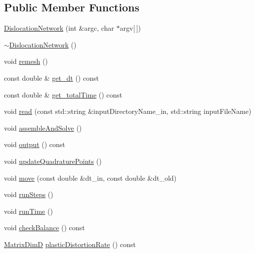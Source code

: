 \subsection*{Public Member Functions}
\begin{DoxyCompactItemize}
\item 
\hyperlink{classmodel_1_1_dislocation_network_a2fb437bf9aa809f61872b6de67f3f427}{Dislocation\+Network} (int \&argc, char $\ast$argv\mbox{[}$\,$\mbox{]})
\item 
\hyperlink{classmodel_1_1_dislocation_network_ae0f3114527433e67c6172b290516092c}{$\sim$\+Dislocation\+Network} ()
\item 
void \hyperlink{classmodel_1_1_dislocation_network_a997aa526174dcf7107679491327b0f5a}{remesh} ()
\item 
const double \& \hyperlink{classmodel_1_1_dislocation_network_a145a43082501e4db457dc6f6124da73e}{get\+\_\+dt} () const 
\item 
const double \& \hyperlink{classmodel_1_1_dislocation_network_a373c26b20826fb4a66d45e1089e9371f}{get\+\_\+total\+Time} () const 
\item 
void \hyperlink{classmodel_1_1_dislocation_network_abcb18582e96165f90faf5392e2542439}{read} (const std\+::string \&input\+Directory\+Name\+\_\+in, std\+::string input\+File\+Name)
\item 
void \hyperlink{classmodel_1_1_dislocation_network_a9a127bef2d8312b3ca9521344c483f64}{assemble\+And\+Solve} ()
\item 
void \hyperlink{classmodel_1_1_dislocation_network_a2fc08a55c9e8909515fd103294cb4897}{output} () const 
\item 
void \hyperlink{classmodel_1_1_dislocation_network_aaf1f4de227bcd3e708b48b5284b29464}{update\+Quadrature\+Points} ()
\item 
void \hyperlink{classmodel_1_1_dislocation_network_a383f33f486841aeaa11477f4cb3c4bd4}{move} (const double \&dt\+\_\+in, const double \&dt\+\_\+old)
\item 
void \hyperlink{classmodel_1_1_dislocation_network_a3f9d89b936222954861d3366d7b971dd}{run\+Steps} ()
\item 
void \hyperlink{classmodel_1_1_dislocation_network_aeac382c9e8b6df7737f9fa3d9fe46413}{run\+Time} ()
\item 
void \hyperlink{classmodel_1_1_dislocation_network_ad3beb09ab57a000d251581e4399f549e}{check\+Balance} () const 
\item 
\hyperlink{classmodel_1_1_dislocation_network_a9660c892fa8d51215f776fc13f073502}{Matrix\+Dim\+D} \hyperlink{classmodel_1_1_dislocation_network_acb161af61df2d112554b369171b645a9}{plastic\+Distortion\+Rate} () const 

\end{DoxyCompactItemize}
